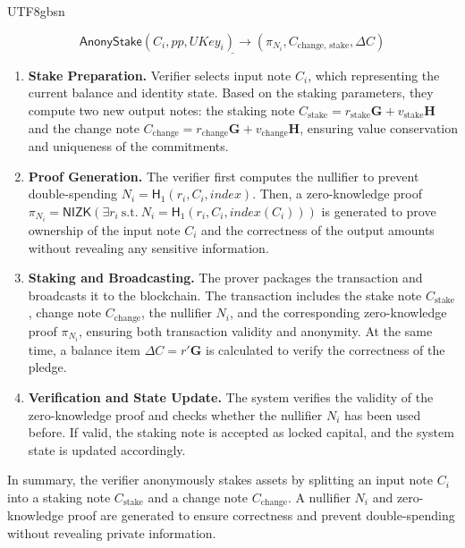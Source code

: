 \documentclass[runningheads]{llncs}
\newcommand{\nizk}{\mathsf{NIZK}}
\newcommand{\hash}{\mathsf{H}}
\begin{document}
\begin{CJK*}{UTF8}{gbsn}
\begin{enumerate}[label=(\arabic*)]
\end{enumerate}

\vspace{-15pt}

\[
\underline{ \mathsf{AnonyStake}(C_i, pp, UKey_i)  \rightarrow (\pi_{N_i}, C_{\text{change, stake}}, \Delta C)  }
\]

\begin{enumerate}[label=(\arabic*)]

    \item \textbf{Stake Preparation.}  
    Verifier selects input note $ C_i $, which representing the current balance and identity state. Based on the staking parameters, they compute two new output notes: the staking note $ C_{\text{stake}} = r_{\text{stake}} \mathbf{G} + v_{\text{stake}} \mathbf{H} $ and the change note $C_{\text{change}} = r_{\text{change}} \mathbf{G} + v_{\text{change}} \mathbf{H}$, ensuring value conservation and uniqueness of the commitments.
    
    \item \textbf{Proof Generation.}  
    The verifier first computes the nullifier to prevent double-spending $ N_i = \hash_1(r_i, C_i, index) $. Then, a zero-knowledge proof $\pi_{N_i} = \nizk(\exists r_i\ \text{s.t.}\  N_i = \hash_1(r_i, C_i, index(C_i)))$ is generated to prove ownership of the input note \( C_i \) and the correctness of the output amounts without revealing any sensitive information.
    
    \item \textbf{Staking and Broadcasting.}  
    The prover packages the transaction and broadcasts it to the blockchain. The transaction includes the stake note $C_\text{stake}$, change note $C_\text{change}$, the nullifier \( N_i \), and the corresponding zero-knowledge proof \( \pi_{N_i} \), ensuring both transaction validity and anonymity. At the same time, a balance item $\Delta C = r'\mathbf{G}$ is calculated to verify the correctness of the pledge.
    
    \item \textbf{Verification and State Update.}  
    The system verifies the validity of the zero-knowledge proof and checks whether the nullifier \( N_i \) has been used before. If valid, the staking note is accepted as locked capital, and the system state is updated accordingly.

\end{enumerate}

In summary, the verifier anonymously stakes assets by splitting an input note $C_i$ into a staking note $C_{\text{stake}}$ and a change note $C_{\text{change}}$. A nullifier $N_i$ and zero-knowledge proof are generated to ensure correctness and prevent double-spending without revealing private information.


\end{CJK*}
\end{document}
